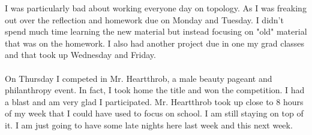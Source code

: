 \documentclass[10pt]{article}
\begin{document}
I was particularly bad about working everyone day on topology. As I was freaking out over the reflection and homework due on Monday and Tuesday. I didn't spend much time learning the new material but instead focusing on "old" material that was on the homework. I also had another project due in one my grad classes and that took up Wednesday and Friday. \\
\\
On Thursday I competed in Mr. Heartthrob, a male beauty pageant and philanthropy event. In fact, I took home the title and won the competition. I had a blast and am very glad I participated. Mr. Heartthrob took up close to 8 hours of my week that I could have used to focus on school. I am still staying on top of it. I am just going to have some late nights here last week and this next week.

\newpage
\end{document}
